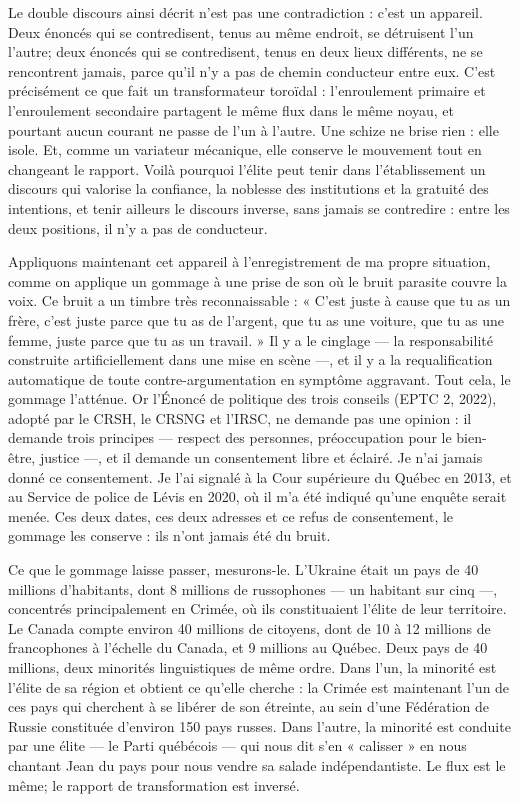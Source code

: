 \documentclass[11pt,a4paper]{article}
\begin{document}
Le double discours ainsi décrit n'est pas une contradiction : c'est un appareil. Deux énoncés qui se contredisent, tenus au même endroit, se détruisent l'un l'autre; deux énoncés qui se contredisent, tenus en deux lieux différents, ne se rencontrent jamais, parce qu'il n'y a pas de chemin conducteur entre eux. C'est précisément ce que fait un transformateur toroïdal : l'enroulement primaire et l'enroulement secondaire partagent le même flux dans le même noyau, et pourtant aucun courant ne passe de l'un à l'autre. Une schize ne brise rien : elle isole. Et, comme un variateur mécanique, elle conserve le mouvement tout en changeant le rapport. Voilà pourquoi l'élite peut tenir dans l'établissement un discours qui valorise la confiance, la noblesse des institutions et la gratuité des intentions, et tenir ailleurs le discours inverse, sans jamais se contredire : entre les deux positions, il n'y a pas de conducteur.

Appliquons maintenant cet appareil à l'enregistrement de ma propre situation, comme on applique un gommage à une prise de son où le bruit parasite couvre la voix. Ce bruit a un timbre très reconnaissable : « C'est juste à cause que tu as un frère, c'est juste parce que tu as de l'argent, que tu as une voiture, que tu as une femme, juste parce que tu as un travail. » Il y a le cinglage — la responsabilité construite artificiellement dans une mise en scène —, et il y a la requalification automatique de toute contre-argumentation en symptôme aggravant. Tout cela, le gommage l'atténue. Or l'Énoncé de politique des trois conseils (EPTC 2, 2022), adopté par le CRSH, le CRSNG et l'IRSC, ne demande pas une opinion : il demande trois principes — respect des personnes, préoccupation pour le bien-être, justice —, et il demande un consentement libre et éclairé. Je n'ai jamais donné ce consentement. Je l'ai signalé à la Cour supérieure du Québec en 2013, et au Service de police de Lévis en 2020, où il m'a été indiqué qu'une enquête serait menée. Ces deux dates, ces deux adresses et ce refus de consentement, le gommage les conserve : ils n'ont jamais été du bruit.

Ce que le gommage laisse passer, mesurons-le. L'Ukraine était un pays de 40 millions d'habitants, dont 8 millions de russophones — un habitant sur cinq —, concentrés principalement en Crimée, où ils constituaient l'élite de leur territoire. Le Canada compte environ 40 millions de citoyens, dont de 10 à 12 millions de francophones à l'échelle du Canada, et 9 millions au Québec. Deux pays de 40 millions, deux minorités linguistiques de même ordre. Dans l'un, la minorité est l'élite de sa région et obtient ce qu'elle cherche : la Crimée est maintenant l'un de ces pays qui cherchent à se libérer de son étreinte, au sein d'une Fédération de Russie constituée d'environ 150 pays russes. Dans l'autre, la minorité est conduite par une élite — le Parti québécois — qui nous dit s'en « calisser » en nous chantant Jean du pays pour nous vendre sa salade indépendantiste. Le flux est le même; le rapport de transformation est inversé.
\end{document}

